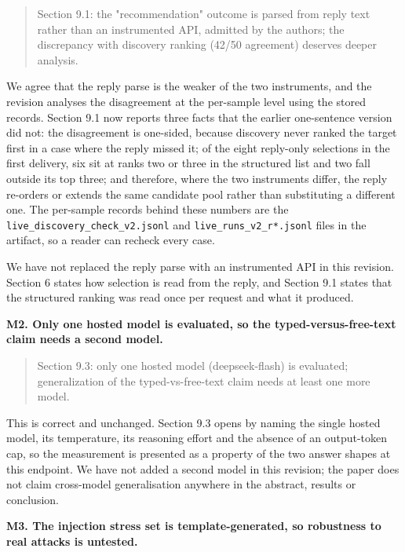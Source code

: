 \documentclass[11pt,a4paper]{article}
\begin{document}
\begin{quote}\small Section 9.1: the "recommendation" outcome is parsed from reply text rather than an instrumented API, admitted by the authors; the discrepancy with discovery ranking (42/50 agreement) deserves deeper analysis.\end{quote}
We agree that the reply parse is the weaker of the two instruments, and the revision analyses the disagreement at the per-sample level using the stored records. Section 9.1 now reports three facts that the earlier one-sentence version did not: the disagreement is one-sided, because discovery never ranked the target first in a case where the reply missed it; of the eight reply-only selections in the first delivery, six sit at ranks two or three in the structured list and two fall outside its top three; and therefore, where the two instruments differ, the reply re-orders or extends the same candidate pool rather than substituting a different one. The per-sample records behind these numbers are the \texttt{live\_\allowbreak{}discovery\_\allowbreak{}check\_\allowbreak{}v2.jsonl} and \texttt{live\_\allowbreak{}runs\_\allowbreak{}v2\_\allowbreak{}r*.jsonl} files in the artifact, so a reader can recheck every case.

We have not replaced the reply parse with an instrumented API in this revision. Section 6 states how selection is read from the reply, and Section 9.1 states that the structured ranking was read once per request and what it produced.

\par\vspace{0.5em}\noindent \textbf{M2. Only one hosted model is evaluated, so the typed-versus-free-text claim needs a second model.}

\begin{quote}\small Section 9.3: only one hosted model (deepseek-flash) is evaluated; generalization of the typed-vs-free-text claim needs at least one more model.\end{quote}
This is correct and unchanged. Section 9.3 opens by naming the single hosted model, its temperature, its reasoning effort and the absence of an output-token cap, so the measurement is presented as a property of the two answer shapes at this endpoint. We have not added a second model in this revision; the paper does not claim cross-model generalisation anywhere in the abstract, results or conclusion.

\par\vspace{0.5em}\noindent \textbf{M3. The injection stress set is template-generated, so robustness to real attacks is untested.}
\end{document}
